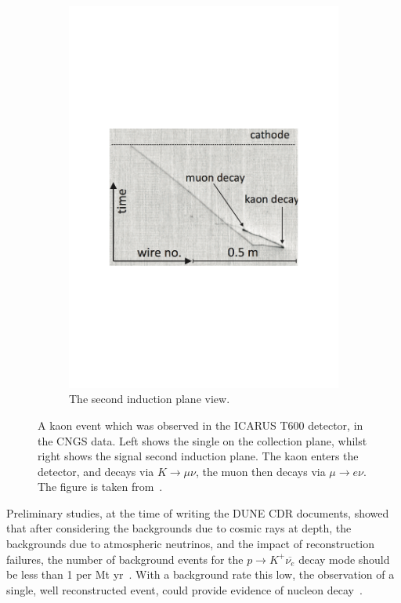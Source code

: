 \begin{figure}
\begin{subfigure}{0.42\textwidth}
    \includegraphics[width=\textwidth]{ICARUSKaon_Ind}
    \caption{The second induction plane view.}
  \end{subfigure}
  \caption[A kaon event which was observed in the ICARUS T600 detector, in the CNGS data]
          {A kaon event which was observed in the ICARUS T600 detector, in the CNGS data. Left shows the single on the collection plane, whilst right shows the signal second induction plane. The kaon enters the detector, and decays via $K \rightarrow \mu \nu$, the muon then decays via $\mu \rightarrow e \nu$. The figure is taken from~\citep{PMTrack}.}
  \label{fig:ICARUSKaon}
\end{figure}

Preliminary studies, at the time of writing the DUNE CDR documents, showed that after considering the backgrounds due to cosmic rays at depth, the backgrounds due to atmospheric neutrinos, and the impact of reconstruction failures, the number of background events for the $p \rightarrow K^{+} \overline{\nu_{e}}$ decay mode should be less than 1 per Mt yr~\citep{Klinger:2015kva, Adams:2013qkq, LBNE8836}. With a background rate this low, the observation of a single, well reconstructed event, could provide evidence of nucleon decay~\citep{DUNECDR_V2}. 

